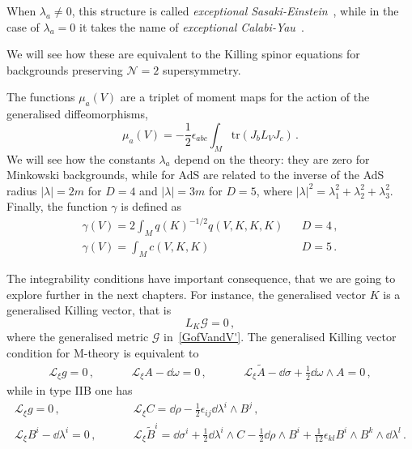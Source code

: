 \documentclass[debug]{phd}
\begin{document}
					When $\lambda_a \neq 0$, this structure is called \emph{exceptional Sasaki-Einstein}~\cite{AshmoreESE}, while in the case of $\lambda_a = 0$ it takes the name of \emph{exceptional Calabi-Yau}~\cite{AshmoreECY}.
					
					We will see how these are equivalent to the Killing spinor equations for backgrounds preserving $\mathcal{N}=2$ supersymmetry.
	
					The functions $\mu_{a} (V)$ are a triplet of moment maps for the action of the generalised diffeomorphisms,
							\begin{equation}
								\mu_a(V) = - \frac{1}{2} \epsilon_{abc} \int_M \mathrm{tr}(J_b L_V J_c)\, .
							\end{equation}	
					We will see how the constants $\lambda_a$ depend on the theory: they are zero for Minkowski backgrounds, while for AdS are related to the inverse of the AdS radius $\lvert \lambda\rvert=2m$ for $D=4$ and $\lvert \lambda\rvert=3m$ for $D=5$, where $\lvert \lambda\rvert^2=\lambda_1^2+\lambda_2^2+\lambda_3^2$. 
					Finally, the function $\gamma$ is defined as
							\begin{equation}
								\begin{array}{llc}
									\gamma (V) = 2 \int_M q(K)^{-1/2} q(V,K,K,K) &{}& D=4\, , \\[1mm]
									\gamma (V) =\int_M c(V,K,K) & {}& D=5 \, .
								\end{array}
							\end{equation}
					
					The integrability conditions have important consequence, that we are going to explore further in the next chapters. 
					For instance, the generalised vector $K$ is a generalised Killing vector, that is
							\begin{equation}
								L_K \mathcal{G} = 0	\, ,
							\end{equation}
					where the generalised metric $\mathcal{G}$ in~\eqref{GofVandV'}. 
					The generalised Killing vector condition for M-theory is equivalent to
							\begin{equation}
								\begin{array}{ccccc}
									\mathcal{L}_\xi g = 0\, , &\phantom{and}& \mathcal{L}_\xi A - \dd \omega = 0\, , &\phantom{and}& \mathcal{L}_\xi \tilde{A} -\dd \sigma + \tfrac{1}{2} \dd \omega \wedge A = 0\, ,
								\end{array}
							\end{equation}
					while in type IIB one has
							\begin{equation}
								\begin{array}{lcl}
									\mathcal{L}_\xi g = 0\, , &\phantom{and}& \mathcal{L}_\xi C = \dd \rho - \tfrac{1}{2}\epsilon_{ij}\dd \lambda^i \wedge B^j \, , \\[1mm] 
									\mathcal{L}_\xi B^i - \dd \lambda^i = 0\, , &\phantom{and}& \mathcal{L}_\xi \tilde{B}^i = \dd \sigma^i + \tfrac{1}{2} \dd \lambda^i \wedge C - \tfrac{1}{2} \dd \rho \wedge B^i + \tfrac{1}{12}\epsilon_{kl} B^i \wedge B^k \wedge \dd \lambda^l \, .
								\end{array}
							\end{equation}
\end{document}
